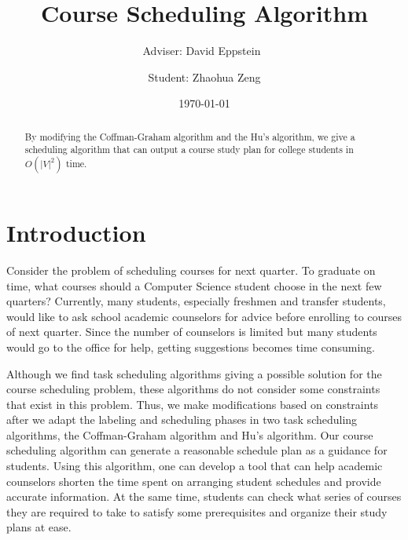 \documentclass[letterpaper,12pt]{article}
\title{Course Scheduling Algorithm}
\author{Adviser: David Eppstein\
\and Student: Zhaohua Zeng}
\date{\today}
\theoremstyle{definition}
\begin{document}











\maketitle

\tableofcontents
\newpage
\begin{abstract}
	By modifying the Coffman-Graham algorithm and the Hu’s algorithm, we give a scheduling algorithm that can output a course study plan for college students in $O(|V|^2)$ time. 
\end{abstract}
\section{Introduction}
Consider the problem of scheduling courses for next quarter. To graduate on time, what courses should a Computer Science student choose in the next few quarters? Currently, many students, especially freshmen and transfer students, would like to ask school academic counselors for advice before enrolling to courses of next quarter. Since the number of counselors is limited but many students would go to the office for help, getting suggestions becomes time consuming. 

Although we find task scheduling algorithms giving a possible solution for the course scheduling problem, these algorithms do not consider some constraints that exist in this problem. Thus, we make modifications based on constraints after we adapt the labeling and scheduling phases in two task scheduling algorithms, the Coffman-Graham algorithm and Hu's algorithm. Our course scheduling algorithm can generate a reasonable schedule plan as a guidance for students. Using this algorithm, one can develop a tool that can help academic counselors shorten the time spent on arranging student schedules and provide accurate information. At the same time, students can check what series of courses they are required to take to satisfy some prerequisites and organize their study plans at ease.
\end{document}
